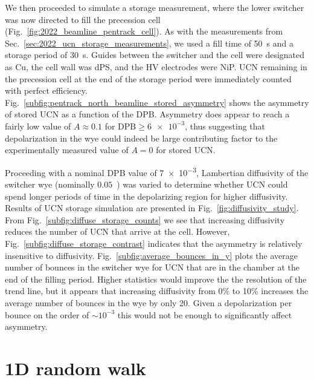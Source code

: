 We then proceeded to simulate a storage measurement, where the lower switcher was now directed to fill the precession cell (Fig.~\ref{fig:2022_beamline_pentrack_cell}). As with the measurements from Sec.~\ref{sec:2022_ucn_storage_measurements}, we used a fill time of \qty{50}{s} and a storage period of \qty{30}{s}. Guides between the switcher and the cell were designated as Cu, the cell wall was dPS, and the HV electrodes were NiP. UCN remaining in the precession cell at the end of the storage period were immediately counted with perfect efficiency. Fig.~\ref{subfig:pentrack_north_beamline_stored_asymmetry} shows the asymmetry of stored UCN as a function of the DPB. Asymmetry does appear to reach a fairly low value of $A\approx 0.1$ for $\text{DPB}\geq \num{6e-3}$, thus suggesting that depolarization in the wye could indeed be large contributing factor to the experimentally measured value of $A=0$ for stored UCN.

Proceeding with a nominal DPB value of \num{7e-3}, Lambertian diffusivity of the switcher wye (nominally $0.05$~\cite{pattie_jr_evaluation_2017}) was varied to determine whether UCN could spend longer periods of time in the depolarizing region for higher diffusivity. Results of UCN storage simulation are presented in Fig.~\ref{fig:diffusivity_study}. From Fig.~\ref{subfig:diffuse_storage_counts} we see that increasing diffusivity reduces the number of UCN that arrive at the cell. However, Fig.~\ref{subfig:diffuse_storage_contrast} indicates that the asymmetry is relatively insensitive to diffusivity. Fig.~\ref{subfig:average_bounces_in_y} plots the average number of bounces in the switcher wye for UCN that are in the chamber at the end of the filling period. Higher statistics would improve the the resolution of the trend line, but it appears that increasing diffusivity from 0\% to 10\% increases the average number of bounces in the wye by only 20. Given a depolarization per bounce on the order of $\sim 10^{-3}$ this would not be enough to significantly affect asymmetry.


\section{1D random walk}\label{sec:1D_random_walk}


